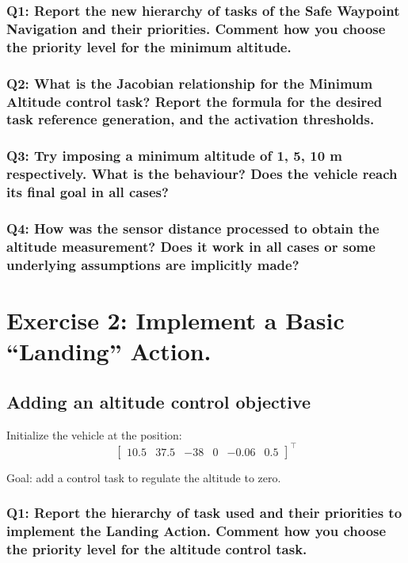 \documentclass{article}
\begin{document}
\subsubsection{Q1: Report the new hierarchy of tasks of the Safe Waypoint Navigation and their priorities. Comment how you choose the priority level for the minimum altitude.}

\subsubsection{Q2: What is the Jacobian relationship for the Minimum Altitude control task? Report the formula for the desired task reference generation, and the activation thresholds.}

\subsubsection{Q3: Try imposing a minimum altitude of 1, 5, 10 m respectively. What is the behaviour? Does the vehicle reach its final goal in all cases?}

\subsubsection{Q4: How was the sensor distance processed to obtain the altitude measurement? Does it work in all cases or some underlying assumptions are implicitly made?}

\clearpage

\section{Exercise 2: Implement a Basic “Landing” Action.}
\subsection{Adding an altitude control objective}
Initialize the vehicle at the position:
\begin{displaymath}
\begin{bmatrix} 10.5 & 37.5 & -38 & 0 & -0.06 & 0.5 \end{bmatrix}^\top
\end{displaymath} 

Goal: add a control task to regulate the altitude to zero.

\subsubsection{Q1: Report the hierarchy of task used and their priorities to implement the Landing Action. Comment how you choose the priority level for the altitude control task.}
\end{document}
